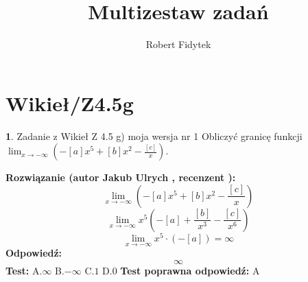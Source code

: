\documentclass[12pt, a4paper]{article}
\title{Multizestaw zadań}
\author{Robert Fidytek}
\date{}
\theoremstyle{definition} %
\newtheorem{zad}{}
\newcommand{\kategoria}[1]{\section{#1}} %
\newcommand{\zadStart}[1]{\begin{zad}#1\newline} %
\newcommand{\zadStop}{\end{zad}}   %
\newcommand{\rozwStart}[2]{\noindent \textbf{Rozwiązanie (autor #1 , recenzent #2): }\newline} %
\newcommand{\rozwStop}{\newline}                                            %
\newcommand{\odpStart}{\noindent \textbf{Odpowiedź:}\newline}    %
\newcommand{\odpStop}{\newline}                                             %
\newcommand{\testStart}{\noindent \textbf{Test:}\newline} %
\newcommand{\testStop}{\newline} %
\newcommand{\kluczStart}{\noindent \textbf{Test poprawna odpowiedź:}\newline} %
\newcommand{\kluczStop}{\newline} %
\begin{document}
\maketitle


\kategoria{Wikieł/Z4.5g}
\zadStart{Zadanie z Wikieł Z 4.5 g) moja wersja nr 1}
Obliczyć granicę funkcji $\lim_{x \to -\infty}(-[a]x^{5}+[b]x^{2}-\frac{[c]}{x})$.
\zadStop
\rozwStart{Jakub Ulrych}{}
$$\lim_{x \to -\infty}(-[a]x^{5}+[b]x^{2}-\frac{[c]}{x})$$
$$\lim_{x \to -\infty}x^{5}(-[a]+\frac{[b]}{x^{3}}-\frac{[c]}{x^{6}})$$
$$\lim_{x \to -\infty}x^{5}\cdot(-[a])=\infty$$
\rozwStop
\odpStart
$$\infty$$
\odpStop
\testStart
A.$\infty$
B.$-\infty$
C.$1$
D.$0$
\testStop
\kluczStart
A
\kluczStop
\end{document}

